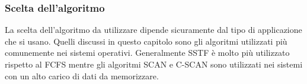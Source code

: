 % 
\subsubsection{Scelta dell'algoritmo}
La scelta dell'algoritmo da utilizzare dipende sicuramente dal tipo di applicazione che si usano. Quelli discussi in questo capitolo sono gli algoritmi utilizzati più comunemente nei sistemi operativi. Generalmente SSTF è molto più utilizzato rispetto al FCFS mentre gli algoritmi SCAN e C-SCAN sono utilizzati nei sistemi con un alto carico di dati da memorizzare. 





